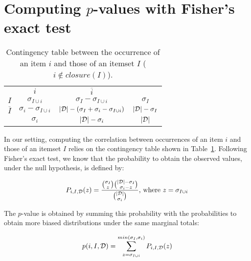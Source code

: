 \vfill
\pagebreak

\section{Computing $p$-values with Fisher's exact test}
\label{sec:fisher:base}

\begin{table}
	\centering
	\begin{tabular}{c|c|c||c|}
\multicolumn{1}{c}{} & \multicolumn{1}{c}{$i$}    & \multicolumn{1}{c}{$\overline{i}$} & \multicolumn{1}{c}{} \\
\cline{2-4}
$I$                  & $\sigma_{I \cup i}$              & $\sigma_{I} - \sigma_{I \cup i}$   & $\sigma_{I}$   \\
\cline{2-4}
$\overline{I}$       & $\sigma_{i} - \sigma_{I \cup i}$ & $|{\cal D}| - (\sigma_{I} + \sigma_{i} - \sigma_{I \cup i})$          & $|{\cal D}| - \sigma_{I}$  \\
\hhline{~===}
\multicolumn{1}{c|}{}&  $\sigma_{i}$                    & $|{\cal D}| - \sigma_{i}$       &  $|{\cal D}|$ \\
\cline{2-4}
	\end{tabular}
	\caption{\label{tab:crosstab}
	Contingency table between the occurrence of an item $i$ and those of an itemset $I$ ($i \notin \mathit{closure}(I)$).}
\end{table}

In our setting, computing the correlation between occurrences of an item $i$ and
those of an itemset $I$ relies on the contingency table shown in Table~\ref{tab:crosstab}.
Following Fisher's exact test, we know that the probability to obtain the observed values,
under the null hypothesis, is defined by:

\begin{equation*}
	P_{i,I,{\cal D}}(z) = \frac{ \binom{\sigma_{I}}{z} \binom{|{\cal D}| - \sigma_{I}}{\sigma_{i}-z} }
							{ \binom{|{\cal D}|}{\sigma_{i}} }
						\text{, where } z=\sigma_{I \cup i}
\end{equation*}

The $p$-value is obtained by summing this probability with
the probabilities to obtain more biased distributions under the same marginal totals:

\begin{equation*}
	p(i,I,{\cal D}) = \sum_{z=\sigma_{I \cup i}}^{min(\sigma_{I}, \sigma_{i})}{P_{i,I,{\cal D}}(z)}
\end{equation*}

